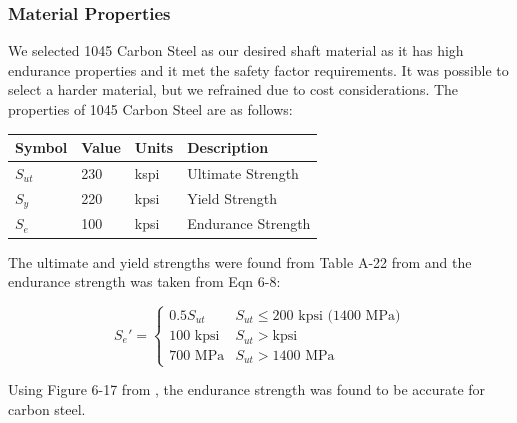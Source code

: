 \documentclass[letterpaper,12pt]{article}
\begin{document}
\subsubsection{Material Properties}

We selected 1045 Carbon Steel as our desired shaft material as it has high endurance properties and it met the safety factor requirements. It was possible to select a harder material, but we refrained due to cost considerations. The properties of 1045 Carbon Steel are as follows:

\begin{center}
	\begin{tabular}{ |p{1.5cm}||p{1cm}|p{2cm}|p{7cm}|  }
		\hline
		Symbol & Value & Units & Description\\
		\hline
		$S_{ut}$ & 230 & kspi & Ultimate Strength\\
        $S_y$ & 220 & kpsi  & Yield Strength\\			
		$S_e$ & 100 & kpsi  & Endurance Strength\\
		\hline
	\end{tabular}
\end{center}

\noindent The ultimate and yield strengths were found from Table A-22 from \cite{shigley} and the endurance strength was taken from Eqn 6-8:

\begin{equation*}
    S_e' = 
    \begin{cases}
    0.5S_{ut} & S_{ut} \leq 200 \text{ kpsi (1400 MPa)}\\
    100 \text{ kpsi} & S_{ut} > \text{kpsi}\\
    700 \text{ MPa} & S_{ut} > 1400 \text{ MPa}
    \end{cases}
\end{equation*}

\noindent Using Figure 6-17 from \cite{shigley}, the endurance strength was found to be accurate for carbon steel.
\end{document}
